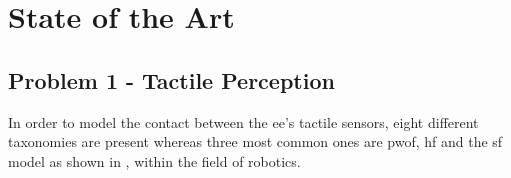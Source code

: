
\chapter{State of the Art} \label{ch:state-of-the-art}

\section{Problem 1 - Tactile Perception} \label{sec:lit-rev-problem-1}

In order to model the contact between the \gls{ee}'s tactile sensors, eight different taxonomies are present\cite*{articulated-hands-force-control-and-kinematic-issues} whereas three most common ones are \gls{pwof}, \gls{hf} and the \gls{sf} model as shown in , within the field of robotics\cite[Chapter 37]{handbook-of-robotics}. \medskip

